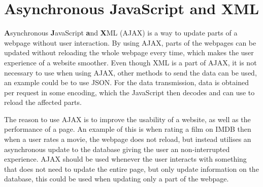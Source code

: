 \section{Asynchronous JavaScript and XML}
\textbf{A}synchronous \textbf{J}avaScript \textbf{a}nd \textbf{X}ML (AJAX) is a way to update parts of a webpage without user interaction.
By using AJAX, parts of the webpages can be updated without reloading the whole webpage every time, which makes the user experience of a website smoother.
Even though XML is a part of AJAX, it is not necessary to use when using AJAX, other methods to send the data can be used, an example could be to use JSON.
For the data transmission, data is obtained per request in some encoding, which the JavaScript then decodes and can use to reload the affected parts.

The reason to use AJAX is to improve the usability of a website, as well as the performance of a page.
An example of this is when rating a film on IMDB \citep{misc:imdb} then when a user rates a movie, the webpage does not reload, but instead utilises an asynchronous update to the database giving the user an non-interrupted experience.
AJAX should be used whenever the user interacts with something that does not need to update the entire page, but only update information on the database, this could be used when updating only a part of the webpage.
